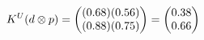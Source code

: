 \documentclass[preview]{standalone}
\begin{document}
\begin{align*}
\special{dvisvgm:raw <g id='unique000'>}K^U(d \otimes p) = \begin{pmatrix} (0.68)(0.56) \\ (0.88)(0.75) \end{pmatrix} = \begin{pmatrix} 0.38 \\ 0.66 \end{pmatrix}\special{dvisvgm:raw </g>}
\end{align*}
\end{document}
